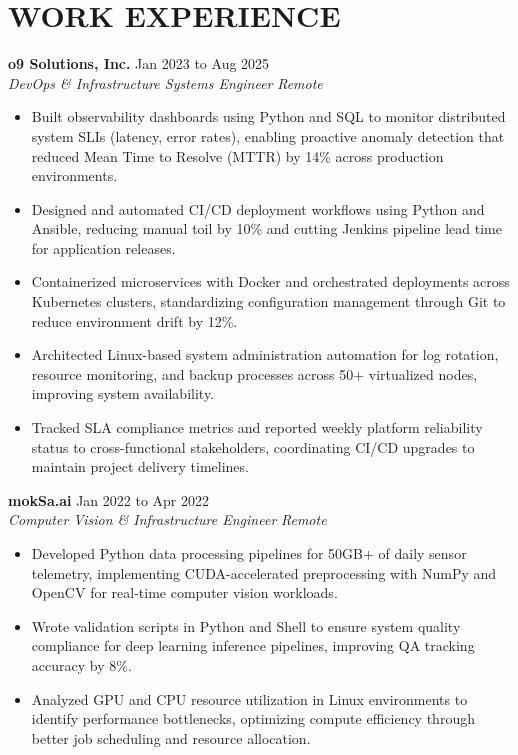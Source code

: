\documentclass[11pt,letterpaper]{article}
\begin{document}
\section*{WORK EXPERIENCE}
\noindent\small \textbf{o9 Solutions, Inc.} \hfill Jan 2023 to Aug 2025 \\
\textit{DevOps \& Infrastructure Systems Engineer} \hfill \textit{Remote}
\begin{itemize}
\item Built observability dashboards using Python and SQL to monitor distributed system SLIs (latency, error rates), enabling proactive anomaly detection that reduced Mean Time to Resolve (MTTR) by 14\% across production environments.
\item Designed and automated CI/CD deployment workflows using Python and Ansible, reducing manual toil by 10\% and cutting Jenkins pipeline lead time for application releases.
\item Containerized microservices with Docker and orchestrated deployments across Kubernetes clusters, standardizing configuration management through Git to reduce environment drift by 12\%.
\item Architected Linux-based system administration automation for log rotation, resource monitoring, and backup processes across 50+ virtualized nodes, improving system availability.
\item Tracked SLA compliance metrics and reported weekly platform reliability status to cross-functional stakeholders, coordinating CI/CD upgrades to maintain project delivery timelines.
\end{itemize}
\noindent\small \textbf{mokSa.ai} \hfill Jan 2022 to Apr 2022 \\
\textit{Computer Vision \& Infrastructure Engineer} \hfill \textit{Remote}
\begin{itemize}
\item Developed Python data processing pipelines for 50GB+ of daily sensor telemetry, implementing CUDA-accelerated preprocessing with NumPy and OpenCV for real-time computer vision workloads.
\item Wrote validation scripts in Python and Shell to ensure system quality compliance for deep learning inference pipelines, improving QA tracking accuracy by 8\%.
\item Analyzed GPU and CPU resource utilization in Linux environments to identify performance bottlenecks, optimizing compute efficiency through better job scheduling and resource allocation.
\end{itemize}
\end{document}
